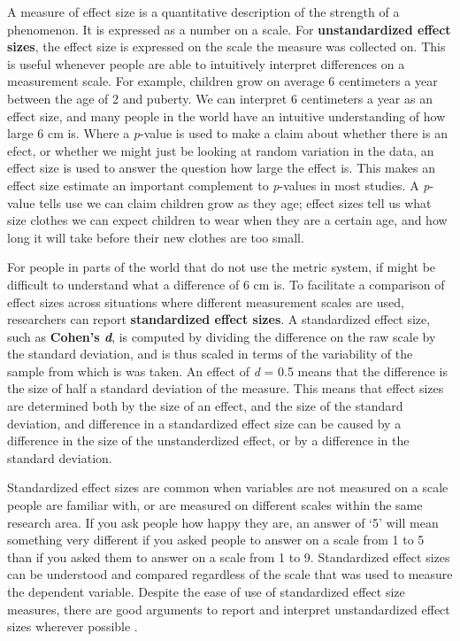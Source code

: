 \documentclass[
  oneside]{book}
\begin{document}
A measure of effect size is a quantitative description of the strength of a phenomenon. It is expressed as a number on a scale. For \textbf{unstandardized effect sizes}, the effect size is expressed on the scale the measure was collected on. This is useful whenever people are able to intuitively interpret differences on a measurement scale. For example, children grow on average 6 centimeters a year between the age of 2 and puberty. We can interpret 6 centimeters a year as an effect size, and many people in the world have an intuitive understanding of how large 6 cm is. Where a \emph{p}-value is used to make a claim about whether there is an efect, or whether we might just be looking at random variation in the data, an effect size is used to answer the question how large the effect is. This makes an effect size estimate an important complement to \emph{p}-values in most studies. A \emph{p}-value tells use we can claim children grow as they age; effect sizes tell us what size clothes we can expect children to wear when they are a certain age, and how long it will take before their new clothes are too small.

For people in parts of the world that do not use the metric system, if might be difficult to understand what a difference of 6 cm is. To facilitate a comparison of effect sizes across situations where different measurement scales are used, researchers can report \textbf{standardized effect sizes}. A standardized effect size, such as \textbf{Cohen's \emph{d}}, is computed by dividing the difference on the raw scale by the standard deviation, and is thus scaled in terms of the variability of the sample from which is was taken. An effect of \emph{d} = 0.5 means that the difference is the size of half a standard deviation of the measure. This means that effect sizes are determined both by the size of an effect, and the size of the standard deviation, and difference in a standardized effect size can be caused by a difference in the size of the unstanderdized effect, or by a difference in the standard deviation.

Standardized effect sizes are common when variables are not measured on a scale people are familiar with, or are measured on different scales within the same research area. If you ask people how happy they are, an answer of `5' will mean something very different if you asked people to answer on a scale from 1 to 5 than if you asked them to answer on a scale from 1 to 9. Standardized effect sizes can be understood and compared regardless of the scale that was used to measure the dependent variable. Despite the ease of use of standardized effect size measures, there are good arguments to report and interpret unstandardized effect sizes wherever possible \citep{baguley_standardized_2009}.
\end{document}
